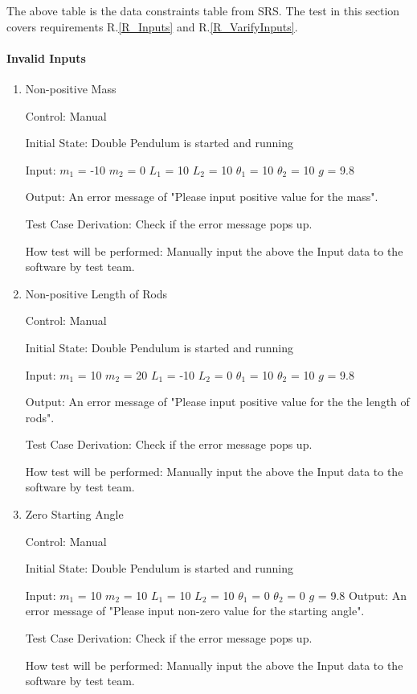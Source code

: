 \documentclass[12pt, titlepage]{article}
\begin{document}
The above table is the data constraints table from SRS. The test in this section
covers requirements R.\ref{R_Inputs} and R.\ref{R_VarifyInputs}.

\paragraph{Invalid Inputs}

\begin{enumerate}
					
\item{Non-positive Mass}

Control: Manual  
					
Initial State: Double Pendulum is started and running
					
Input: 
$m_1$ = -10
$m_2$ = 0
$L_1$ = 10
$L_2$	= 10			
$\theta_1$ = 10 
$\theta_2$ = 10
$g$ = 9.8

Output: An error message of "Please input positive value for the mass".

Test Case Derivation: Check if the error message pops up. 

How test will be performed: Manually input the above the Input data to the
software by test team.

\item{Non-positive Length of Rods}  

Control: Manual 
          
Initial State: Double Pendulum is started and running
          
Input: 
$m_1$ = 10
$m_2$ = 20
$L_1$ = -10
$L_2$ = 0      
$\theta_1$ = 10 
$\theta_2$ = 10
$g$ = 9.8
          
Output: An error message of "Please input positive value for the the length of
rods".

Test Case Derivation: Check if the error message pops up. 

How test will be performed: Manually input the above the Input data to the
software by test team.
           
\item{Zero Starting Angle}  

  Control: Manual  
          
  Initial State: Double Pendulum is started and running
          
  Input: $m_1$ = 10 $m_2$ = 10 $L_1$ = 10 $L_2$ = 10 $\theta_1$ = 0 $\theta_2$ =
  0 $g$ = 9.8 Output: An error message of "Please input non-zero value for the
  starting angle".

  Test Case Derivation: Check if the error message pops up.

  How test will be performed: Manually input the above the Input data to the
  software by test team.
  
\end{enumerate}
\end{document}
